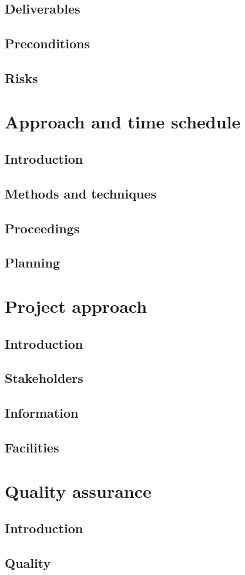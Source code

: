 \documentclass[]{article}
\begin{document}
\subsection{Deliverables}
\subsection{Preconditions}
\subsection{Risks}
\section{Approach and time schedule}
\subsection{Introduction}
\subsection{Methods and techniques}
\subsection{Proceedings}
\subsection{Planning}
\section{Project approach}
\subsection{Introduction}
\subsection{Stakeholders}
\subsection{Information}
\subsection{Facilities}
\section{Quality assurance}
\subsection{Introduction}
\subsection{Quality}
\end{document}
